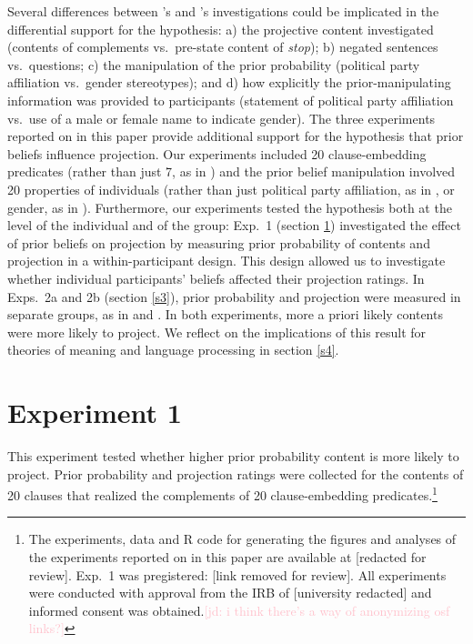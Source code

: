 \documentclass[11pt,fleqn]{article}
\newcommand{\jd}[1]{\textcolor{Pink}{[jd: #1]}}
\newcommand{\6}{\mbox{$[\hspace*{-.6mm}[$}}
\newcommand{\9}{\mbox{$]\hspace*{-.6mm}]$}}
\newcommand{\citeposs}[1]{\citeauthor{#1}'s}
\begin{document}
Several differences between \citeposs{mahler2020} and \citeposs{lorson2018} investigations could be implicated in the differential support for the hypothesis: a) the projective content investigated (contents of complements vs.\ pre-state content of {\em stop}); b) negated sentences vs.\ questions; c) the manipulation of the prior probability (political party affiliation vs.\ gender stereotypes); and d) how explicitly the prior-manipulating information was provided to participants (statement of political party affiliation vs.\  use of a male or female name to indicate gender). The three experiments reported on in this paper provide additional support for the hypothesis that prior beliefs influence projection. Our experiments included 20 clause-embedding predicates (rather than just 7, as in ) and the prior belief manipulation involved 20 properties of individuals (rather than just political party affiliation, as in , or gender, as in ). Furthermore, our experiments tested the hypothesis both at the level of the individual and of the group: Exp.~1 (section \ref{s2}) investigated the effect of prior beliefs on projection by measuring prior probability of contents and projection in a within-participant design. This design allowed us to investigate whether individual participants' beliefs affected their projection ratings. In Exps.~2a and 2b (section \ref{s3}), prior probability and projection were measured in separate groups, as in  and . In both experiments, more a priori likely contents were more likely to project. We reflect on the implications of this result for theories of meaning and language processing in section \ref{s4}. 

\section{Experiment 1}\label{s2}

This experiment tested whether higher prior probability content is more likely to project. Prior probability and projection ratings were collected for the contents of 20 clauses that realized the complements of 20 clause-embedding predicates.\footnote{\label{f-github}The experiments, data and R code for generating the figures and analyses of the experiments reported on in this paper are available at [redacted for review]. Exp.~1 was pregistered: [link removed for review]. All experiments were conducted with approval from the IRB of [university redacted] and informed consent was obtained.\jd{i think there's a way of anonymizing osf links?}}
\end{document}
